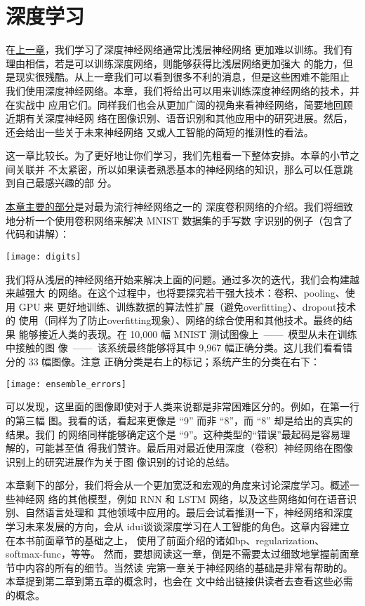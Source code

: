 
\chapter{深度学习}
\label{ch:Deeplearning}

在\hyperref[ch:WhyHardToTrain]{上一章}，我们学习了深度神经网络通常比浅层神经网络
更加难以训练。我们有理由相信，若是可以训练深度网络，则能够获得比浅层网络更加强大
的能力，但是现实很残酷。从上一章我们可以看到很多不利的消息，但是这些困难不能阻止
我们使用深度神经网络。本章，我们将给出可以用来训练深度神经网络的技术，并在实战中
应用它们。同样我们也会从更加广阔的视角来看神经网络，简要地回顾近期有关深度神经网
络在图像识别、语音识别和其他应用中的研究进展。然后，还会给出一些关于未来神经网络
又或人工智能的简短的推测性的看法。

这一章比较长。为了更好地让你们学习，我们先粗看一下整体安排。本章的小节之间关联并
不太紧密，所以如果读者熟悉基本的神经网络的知识，那么可以任意跳到自己最感兴趣的部
分。

\hyperref[sec:convolutional_networks]{本章主要的部分}是对最为流行神经网络之一的
深度卷积网络的介绍。我们将细致地分析一个使用卷积网络来解决 MNIST 数据集的手写数
字识别的例子（包含了代码和讲解）：
\begin{center}
  \texttt{[image: digits]}
\end{center}

我们将从浅层的神经网络开始来解决上面的问题。通过多次的迭代，我们会构建越来越强大
的网络。在这个过程中，也将要探究若干强大技术：卷积、\gls*{pooling}、使用 GPU 来
更好地训练、训练数据的算法性扩展（避免\gls*{overfitting}）、\gls*{dropout}技术的
使用（同样为了防止\gls*{overfitting}现象）、网络的综合使用和其他技术。最终的结果
能够接近人类的表现。在 10,000 幅 MNIST 测试图像上~——~模型从未在训练中接触的图
像~——~该系统最终能够将其中 9,967 幅正确分类。这儿我们看看错分的 33 幅图像。注意
正确分类是右上的标记；系统产生的分类在右下：
\begin{center}
  \texttt{[image: ensemble\_errors]}
\end{center}

可以发现，这里面的图像即使对于人类来说都是非常困难区分的。例如，在第一行的第三幅
图。我看的话，看起来更像是 “9” 而非 “8”，而 “8” 却是给出的真实的结果。我们
的网络同样能够确定这个是 “9”。这种类型的“错误”最起码是容易理解的，可能甚至值
得我们赞许。最后用对最近使用深度（卷积）神经网络在图像识别上的研究进展作为关于图
像识别的讨论的总结。

本章剩下的部分，我们将会从一个更加宽泛和宏观的角度来讨论深度学习。概述一些神经网
络的其他模型，例如 RNN 和 LSTM 网络，以及这些网络如何在语音识别、自然语言处理和
其他领域中应用的。最后会试着推测一下，神经网络和深度学习未来发展的方向，会从%
\gls*{idui}谈谈深度学习在人工智能的角色。这章内容建立在本书前面章节的基础之上，
使用了前面介绍的诸如\gls*{bp}、\gls*{regularization}、\gls*{softmax-func}，等等。
然而，要想阅读这一章，倒是不需要太过细致地掌握前面章节中内容的所有的细节。当然读
完第一章关于神经网络的基础是非常有帮助的。本章提到第二章到第五章的概念时，也会在
文中给出链接供读者去查看这些必需的概念。

